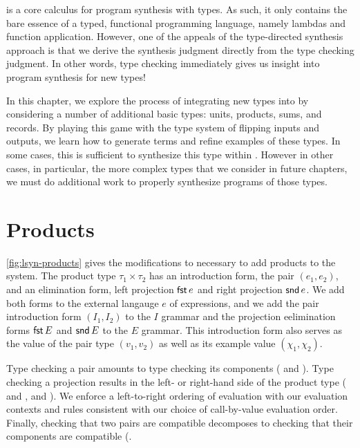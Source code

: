 \lsyn{} is a core calculus for program synthesis with types.
As such, it only contains the bare essence of a typed, functional programming language, namely lambdas and function application.
However, one of the appeals of the type-directed synthesis approach is that we derive the synthesis judgment directly from the type checking judgment.
In other words, type checking immediately gives us insight into program synthesis for new types!

In this chapter, we explore the process of integrating new types into \lsyn{} by considering a number of additional basic types: units, products, sums, and records.
By playing this game with the type system of flipping inputs and outputs, we learn how to generate terms and refine examples of these types.
In some cases, this is sufficient to synthesize this type within \lsyn{}.
However in other cases, in particular, the more complex types that we consider in future chapters, we must do additional work to properly synthesize programs of those types.


\section{Products}



\autoref{fig:lsyn-products} gives the modifications to \lsyn{} necessary to add products to the system.
The product type $τ_1 × τ_2$ has an introduction form, the pair $(e_1, e_2)$, and an elimination form, left projection $\mathsf{fst}\,e$ and right projection $\mathsf{snd}\,e$.
We add both forms to the external langauge $e$ of expressions, and we add the pair introduction form $(I_1, I_2)$ to the $I$ grammar and the projection eelimination forms $\mathsf{fst}\,E$ and $\mathsf{snd}\,E$ to the $E$ grammar.
This introduction form also serves as the value of the pair type $(v_1, v_2)$ as well as its example value $(χ_1, χ_2)$.

Type checking a pair amounts to type checking its components ( and ).
Type checking a projection results in the left- or right-hand side of the product type ( and ,  and ).
We enforce a left-to-right ordering of evaluation with our evaluation contexts and rules consistent with our choice of call-by-value evaluation order.
Finally, checking that two pairs are compatible decomposes to checking that their components are compatible (.

